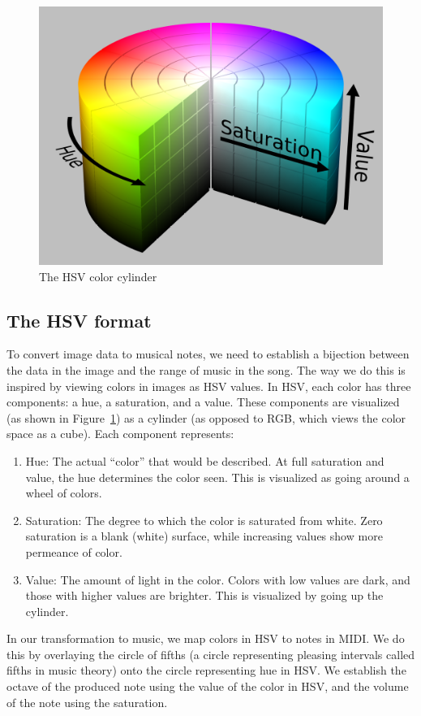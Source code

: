 \documentclass[10pt, conference, compsocconf]{IEEEtran}
\begin{document}
\begin{figure}
  \centering
  \includegraphics[width=.4\textwidth]{hsv.png}
  \caption{The HSV color cylinder}
  \label{fig:hsv}
\end{figure}

\subsection{The HSV format}

To convert image data to musical notes, we need to establish a
bijection between the data in the image and the range of music in the
song.  The way we do this is inspired by viewing colors in images as
HSV values.  In HSV, each color has three components: a hue, a
saturation, and a value.  These components are visualized (as shown in
Figure~\ref{fig:hsv}) as a cylinder (as opposed to RGB, which views
the color space as a cube).  Each component represents:

\begin{enumerate}
\item Hue: The actual ``color'' that would be described.  At full
  saturation and value, the hue determines the color seen.  This is
  visualized as going around a wheel of colors.

\item Saturation: The degree to which the color is saturated from
  white.  Zero saturation is a blank (white) surface, while increasing
  values show more permeance of color.

\item Value: The amount of light in the color.  Colors with low values
  are dark, and those with higher values are brighter.  This is
  visualized by going up the cylinder.
\end{enumerate}

In our transformation to music, we map colors in HSV to notes in MIDI.
We do this by overlaying the circle of fifths (a circle representing
pleasing intervals called fifths in music theory) onto the circle
representing hue in HSV.  We establish the octave of the produced note
using the value of the color in HSV, and the volume of the note using
the saturation.
\end{document}
